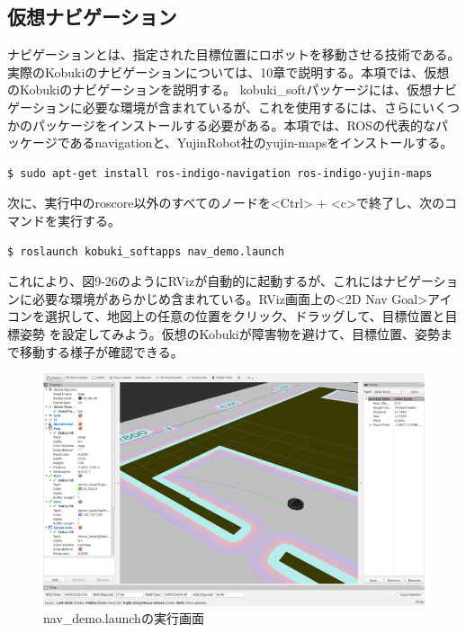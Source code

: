 \begin{itemize}
\subsection{仮想ナビゲーション}

ナビゲーションとは、指定された目標位置にロボットを移動させる技術である。実際のKobukiのナビゲーションについては、10章で説明する。本項では、仮想のKobukiのナビゲーションを説明する。
kobuki\_softパッケージには、仮想ナビゲーションに必要な環境が含まれているが、これを使用するには、さらにいくつかのパッケージをインストールする必要がある。本項では、ROSの代表的なパッケージであるnavigationと、YujinRobot社のyujin-mapsをインストールする。

\begin{lstlisting}[language=ROS]
$ sudo apt-get install ros-indigo-navigation ros-indigo-yujin-maps
\end{lstlisting}

次に、実行中のroscore以外のすべてのノードを<Ctrl> + <c>で終了し、次のコマンドを実行する。

\begin{lstlisting}[language=ROS]
$ roslaunch kobuki_softapps nav_demo.launch
\end{lstlisting}

これにより、図9-26のようにRVizが自動的に起動するが、これにはナビゲーションに必要な環境があらかじめ含まれている。RViz画面上の<2D Nav Goal>アイコンを選択して、地図上の任意の位置をクリック、ドラッグして、目標位置と目標姿勢  を設定してみよう。仮想のKobukiが障害物を避けて、目標位置、姿勢まで移動する様子が確認できる。

\begin{figure}[htp]
  \centering
  \includegraphics[width=\columnwidth]{pictures/chapter9/pic_09_26.png}
  \caption{nav\_demo.launchの実行画面}
\end{figure}


\end{itemize}
